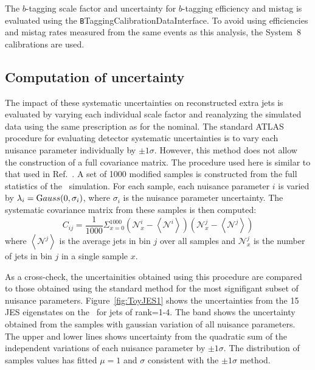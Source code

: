 The $b$-tagging scale factor and uncertainty for $b$-tagging efficiency and mistag is evaluated using the {\texttt BTaggingCalibrationDataInterface}. To avoid using efficiencies and mistag rates measured from the same events as this analysis, the System~8 calibrations
are used.


\subsection{Computation of uncertainty}

The impact of these systematic uncertainties on reconstructed extra jets is evaluated by varying each individual scale factor and reanalyzing the simulated data using the same prescription as for the nominal. The standard ATLAS procedure for evaluating detector systematic uncertainties is to vary each nuisance parameter individually by $\pm 1\sigma$. However, this method does not allow the construction of a full covariance matrix. The procedure used here is similar to that used in Ref.~\cite{Bell:1470588}. A set of 1000 modified samples is constructed from the full statistics of the \powpy\ simulation. For each sample, each nuisance parameter $i$ is varied by $\lambda_i ={\textrm Gauss}(0, \sigma_i)$, where $\sigma_i$ is the nuisance parameter uncertainty. The systematic covariance matrix from these samples is then computed:
\begin{equation}
C_{ij}=\frac{1}{1000} \Sigma_{x=0}^{1000} \left({\mathscr N}_x^i- \left \langle{\mathscr N}^i \right \rangle \right) \left({\mathscr N}_x^j- \left \langle{\mathscr N}^j \right \rangle \right)
\label{eqn:cov}
\end{equation}
where $\left \langle{\mathscr N}^j \right \rangle$ is the average jets in bin $j$ over all samples and ${\mathscr N}_x^j$ is the number of jets in bin $j$ in a single sample $x$. 

As a cross-check, the uncertainities obtained using this procedure are compared to those obtained using the standard method for the most signifigant subset of nuisance parameters. Figure~\ref{fig:ToyJES1} shows the uncertainties from the 15 JES eigenstates on the \pt\ for jets of rank=1-4. The band shows the uncertainty obtained from the samples with gaussian variation of all nuisance parameters. The upper and lower lines shows uncertainty from the quadratic sum of the independent variations of each nuisance parameter by $\pm 1 \sigma$. The distribution of samples values has fitted $\mu=1$ and $\sigma$ consistent with the $\pm 1 \sigma$ method.





